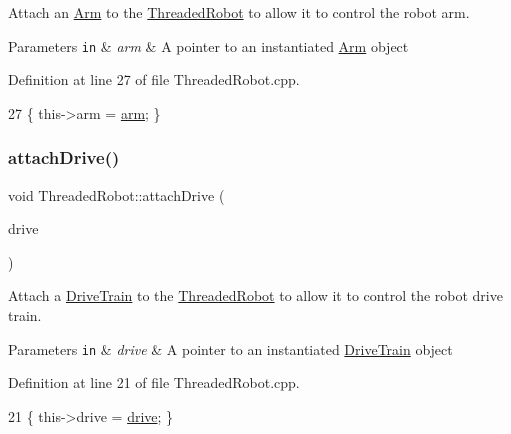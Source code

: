 Attach an \hyperlink{class_arm}{Arm} to the \hyperlink{class_threaded_robot}{Threaded\+Robot} to allow it to control the robot arm. 


\begin{DoxyParams}[1]{Parameters}
\mbox{\tt in}  & {\em arm} & A pointer to an instantiated \hyperlink{class_arm}{Arm} object \\
\hline
\end{DoxyParams}


Definition at line 27 of file Threaded\+Robot.\+cpp.


\begin{DoxyCode}
27 \{ this->arm = \hyperlink{class_threaded_robot_afc4445eed32ecc9c375e17ccf4f37241}{arm}; \}
\end{DoxyCode}
\mbox{\label{class_threaded_robot_a86ab3f2f83958858e47c50004702bba7}} 
\subsubsection{\texorpdfstring{attach\+Drive()}{attachDrive()}}
{\footnotesize\ttfamily void Threaded\+Robot\+::attach\+Drive (\begin{DoxyParamCaption}\item[{\hyperlink{class_drive_train}{Drive\+Train} $\ast$}]{drive }\end{DoxyParamCaption})}



Attach a \hyperlink{class_drive_train}{Drive\+Train} to the \hyperlink{class_threaded_robot}{Threaded\+Robot} to allow it to control the robot drive train. 


\begin{DoxyParams}[1]{Parameters}
\mbox{\tt in}  & {\em drive} & A pointer to an instantiated \hyperlink{class_drive_train}{Drive\+Train} object \\
\hline
\end{DoxyParams}


Definition at line 21 of file Threaded\+Robot.\+cpp.


\begin{DoxyCode}
21 \{ this->drive = \hyperlink{class_threaded_robot_ad666af7d773c8096210f6b5c4d060086}{drive}; \}
\end{DoxyCode}
\mbox{\label{class_threaded_robot_a391a0e982563eaea9dbf60b9d63b72da}} 
